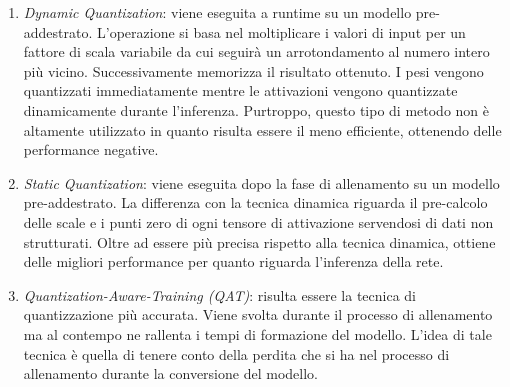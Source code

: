 \begin{enumerate}
    \item \emph{Dynamic Quantization}: viene eseguita a runtime su un modello pre-addestrato. 
    L'operazione si basa nel moltiplicare i valori di input 
    per un fattore di scala variabile da cui seguirà un arrotondamento al 
    numero intero più vicino. Successivamente memorizza il risultato ottenuto. 
    I pesi vengono quantizzati immediatamente mentre le attivazioni 
    vengono quantizzate dinamicamente durante l'inferenza. Purtroppo, 
    questo tipo di metodo non è altamente utilizzato in quanto risulta 
    essere il meno efficiente, ottenendo delle performance negative.
    \item \emph{Static Quantization}: viene eseguita dopo la fase di allenamento su un 
    modello pre-addestrato. La differenza con la tecnica dinamica riguarda 
    il pre-calcolo delle scale e i punti zero di ogni tensore di attivazione 
    servendosi di dati non strutturati. Oltre ad essere più precisa rispetto 
    alla tecnica dinamica, ottiene delle migliori performance per quanto 
    riguarda l'inferenza della rete.
    \item \emph{Quantization-Aware-Training (QAT)}: risulta essere la tecnica di quantizzazione 
    più accurata. Viene svolta durante il processo di allenamento 
    ma al contempo ne rallenta i tempi di formazione del modello. 
    L'idea di tale tecnica è quella di tenere conto della perdita che si ha 
    nel processo di allenamento durante la conversione del modello.
\end{enumerate}

